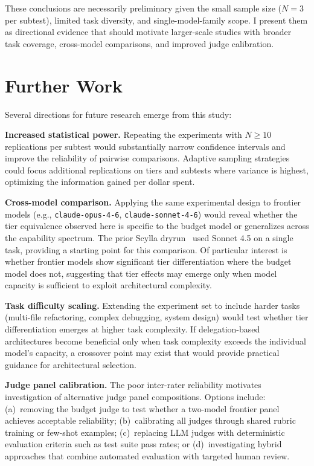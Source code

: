 \documentclass[11pt]{article}
\begin{document}
These conclusions are necessarily preliminary given the small sample size
($N=3$ per subtest), limited task diversity, and single-model-family scope.
I present them as directional evidence that should motivate larger-scale
studies with broader task coverage, cross-model comparisons, and improved
judge calibration.

\section{Further Work}
\label{sec:further_work}

Several directions for future research emerge from this study:

\textbf{Increased statistical power.} Repeating the experiments with
$N \geq 10$ replications per subtest would substantially narrow confidence
intervals and improve the reliability of pairwise comparisons. Adaptive
sampling strategies could focus additional replications on tiers and subtests
where variance is highest, optimizing the information gained per dollar spent.

\textbf{Cross-model comparison.} Applying the same experimental design to
frontier models (e.g., \texttt{claude-opus-4-6}, \texttt{claude-sonnet-4-6})
would reveal whether the tier equivalence observed here is specific to the
budget model or generalizes across the capability spectrum. The prior
Scylla dryrun~\cite{scylla2026dryrun} used Sonnet 4.5 on a single task,
providing a starting point for this comparison. Of particular interest is
whether frontier models show significant tier differentiation where the
budget model does not, suggesting that tier effects may emerge only when
model capacity is sufficient to exploit architectural complexity.

\textbf{Task difficulty scaling.} Extending the experiment set to include
harder tasks (multi-file refactoring, complex debugging, system design) would
test whether tier differentiation emerges at higher task complexity. If
delegation-based architectures become beneficial only when task complexity
exceeds the individual model's capacity, a crossover point may exist that
would provide practical guidance for architectural selection.

\textbf{Judge panel calibration.} The poor inter-rater reliability motivates
investigation of alternative judge panel compositions. Options include:
(a)~removing the budget judge to test whether a two-model frontier panel
achieves acceptable reliability; (b)~calibrating all judges through shared
rubric training or few-shot examples; (c)~replacing LLM judges with
deterministic evaluation criteria such as test suite pass rates; or
(d)~investigating hybrid approaches that combine automated evaluation with
targeted human review.
\end{document}
